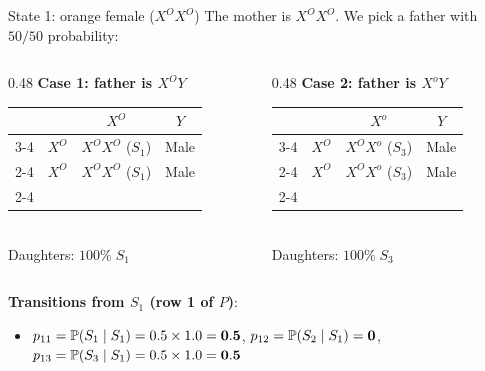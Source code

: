 \documentclass[aspectratio=169]{beamer}\usepackage[]{graphicx}\usepackage[]{xcolor}
\begin{document}
\begin{frame}{State 1: orange female ($X^O X^O$)}
The mother is $X^O X^O$. We pick a father with $50/50$ probability:
\vfill
\begin{columns}[c]
\begin{column}{0.48\textwidth}
\centering
\textbf{Case 1: father is $X^O Y$}\\[0.1cm]
\renewcommand{\arraystretch}{1.25}
\begin{tabular}{c c | c | c |}
\multicolumn{2}{c}{} & \multicolumn{1}{c}{$X^O$} & \multicolumn{1}{c}{$Y$} \\ \cline{3-4}
\multirow{2}{*}{\rotatebox{90}{\footnotesize Mother}} & $X^O$ & \cellcolor{punnettorange}$X^O X^O$ ($S_1$) & \cellcolor{punnettorange}Male \\ \cline{2-4}
& $X^O$ & \cellcolor{punnettorange}$X^O X^O$ ($S_1$) & \cellcolor{punnettorange}Male \\ \cline{2-4}
\end{tabular}
\\[0.1cm]
Daughters: $100\%\; S_1$
\end{column}
\begin{column}{0.48\textwidth}
\centering
\textbf{Case 2: father is $X^o Y$}\\[0.1cm]
\renewcommand{\arraystretch}{1.25}
\begin{tabular}{c c | c | c |}
\multicolumn{2}{c}{} & \multicolumn{1}{c}{$X^o$} & \multicolumn{1}{c}{$Y$} \\ \cline{3-4}
\multirow{2}{*}{\rotatebox{90}{\footnotesize Mother}} & $X^O$ & \cellcolor{punnetttortie}$X^O X^o$ ($S_3$) & \cellcolor{punnettorange}Male \\ \cline{2-4}
& $X^O$ & \cellcolor{punnetttortie}$X^O X^o$ ($S_3$) & \cellcolor{punnettorange}Male \\ \cline{2-4}
\end{tabular}
\\[0.1cm]
Daughters: $100\%\; S_3$
\end{column}
\end{columns}
\vfill
\textbf{Transitions from $S_1$ (row 1 of $P$)}:
\begin{itemize}
\item $p_{11} = \mathbb{P}(S_1 \mid S_1) = 0.5 \times 1.0 = \mathbf{0.5}$, \quad $p_{12} = \mathbb{P}(S_2 \mid S_1) = \mathbf{0}$, \quad $p_{13} = \mathbb{P}(S_3 \mid S_1) = 0.5 \times 1.0 = \mathbf{0.5}$
\end{itemize}
\end{frame}
\end{document}
